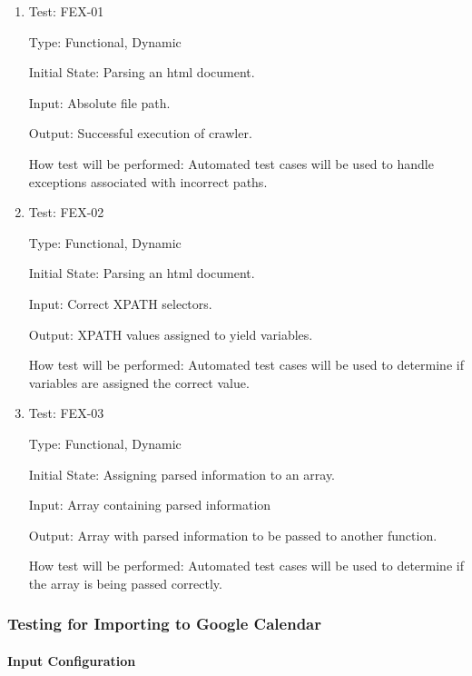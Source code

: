 \documentclass[12pt, titlepage]{article}
\begin{document}
\begin{enumerate}

\item{Test: FEX-01\\}

Type: Functional, Dynamic
					
Initial State: Parsing an html document.
					
Input: Absolute file path.
					
Output: Successful execution of crawler.
					
How test will be performed: Automated test cases will be used to handle exceptions associated with incorrect paths.

\item{Test: FEX-02\\}

Type: Functional, Dynamic
					
Initial State: Parsing an html document.
					
Input: Correct XPATH selectors.
					
Output: XPATH values assigned to yield variables.
					
How test will be performed: Automated test cases will be used to determine if variables are assigned the correct value.

\item{Test: FEX-03\\}

Type: Functional, Dynamic
					
Initial State: Assigning parsed information to an array.
					
Input: Array containing parsed information
					
Output: Array with parsed information to be passed to another function.
					
How test will be performed: Automated test cases will be used to determine if the array is being passed correctly.

\end{enumerate}

\subsubsection{Testing for Importing to Google Calendar}

\paragraph{Input Configuration}
\end{document}
